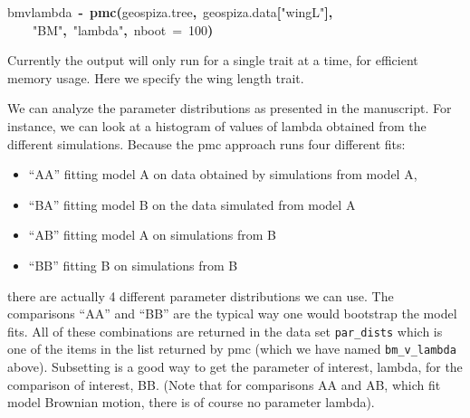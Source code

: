 \documentclass{elsarticle}
\makeatletter
\newcommand{\hlnumber}[1]{\textcolor[rgb]{0,0,0}{#1}}%
\newcommand{\hlfunctioncall}[1]{\textcolor[rgb]{.5,0,.33}{\textbf{#1}}}%
\newcommand{\hlstring}[1]{\textcolor[rgb]{.6,.6,1}{#1}}%
\newcommand{\hlkeyword}[1]{\textbf{#1}}%
\newcommand{\hlargument}[1]{\textcolor[rgb]{.69,.25,.02}{#1}}%
\newcommand{\hlassignement}[1]{\textbf{#1}}%
\newcommand{\hlsymbol}[1]{#1}%
\newcommand{\hlstd}[1]{\textcolor[rgb]{0,0,0}{#1}}%
\newenvironment{kframe}{%
 \def\FrameCommand##1{\hskip\@totalleftmargin \hskip-\fboxsep
 \colorbox{shadecolor}{##1}\hskip-\fboxsep
     \hskip-\linewidth \hskip-\@totalleftmargin \hskip\columnwidth}%
 \MakeFramed {\advance\hsize-\width
   \@totalleftmargin\z@ \linewidth\hsize
   \@setminipage}}%
 {\par\unskip\endMakeFramed}
\newenvironment{knitrout}{}{} %
\makeatother
\begin{document}
\begin{knitrout}
\color{fgcolor}\begin{kframe}
\begin{flushleft}
\ttfamily\noindent
\hlsymbol{bm\usebox{\hlnormalsizeboxunderscore}v\usebox{\hlnormalsizeboxunderscore}lambda}{\ }\hlassignement{\usebox{\hlnormalsizeboxlessthan}-}{\ }\hlfunctioncall{pmc}\hlkeyword{(}\hlsymbol{geospiza.tree}\hlkeyword{,}{\ }\hlsymbol{geospiza.data}\hlkeyword{[}\hlstring{"{}wingL"{}}\hlkeyword{]}\hlkeyword{,}\hspace*{\fill}\\
\hlstd{}{\ }{\ }{\ }{\ }\hlstring{"{}BM"{}}\hlkeyword{,}{\ }\hlstring{"{}lambda"{}}\hlkeyword{,}{\ }\hlargument{nboot}{\ }\hlargument{=}{\ }\hlnumber{100}\hlkeyword{)}\mbox{}
\normalfont
\end{flushleft}
\end{kframe}
\end{knitrout}



Currently the output will only run for a single trait at a time, for efficient memory usage.  Here we specify the wing length trait.  


We can analyze the parameter distributions as presented in the manuscript.  
For instance, we can look at a histogram of values of lambda obtained from the different simulations. 
Because the pmc approach runs four different fits: 
\begin{itemize} 
\item ``AA'' fitting model A on data obtained by simulations from model A,
\item ``BA'' fitting model B on the data simulated from model A
\item ``AB'' fitting model A on simulations from B
\item ``BB'' fitting B on simulations from B
\end{itemize}

there are actually 4 different parameter distributions we can use.  
The comparisons ``AA'' and ``BB'' are the typical way one would bootstrap the model fits.
All of these combinations are returned in the data set \verb|par_dists| which is one of the 
items in the list returned by pmc (which we have named \verb|bm_v_lambda| above).  
Subsetting is a good way to get the parameter of interest, lambda, for the comparison of interest, BB.
(Note that for comparisons AA and AB, which fit model Brownian motion, there is of course no parameter lambda).
\end{document}
